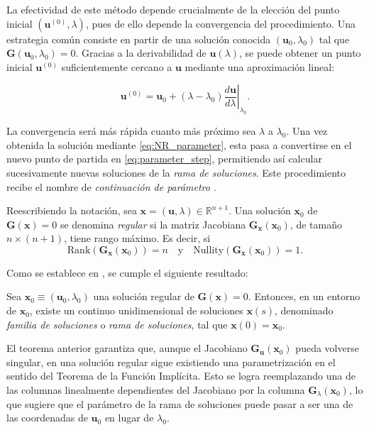 La efectividad de este método depende crucialmente de la elección del punto inicial
$ ( \mathbf{u}^{(0)}, \lambda ) $, pues de ello depende la convergencia del procedimiento.
Una estrategia común consiste en partir de una solución conocida
$ ( \mathbf{u}_0, \lambda_0 ) $ tal que $ \mathbf{G}( \mathbf{u}_0, \lambda_0 ) = 0 $.
Gracias a la derivabilidad de $ \mathbf{u}(\lambda) $, se puede obtener un punto inicial
$ \mathbf{u}^{(0)} $ suficientemente cercano a $ \mathbf{u} $ mediante una aproximación lineal:

\begin{equation}
    \mathbf{u}^{(0)} = \mathbf{u}_0 + (\lambda - \lambda_0)\left.\dfrac{d\mathbf{u}}{d\lambda}\right|_{\lambda_0}.
    \label{eq:parameter_step}
\end{equation}

La convergencia será más rápida cuanto más próximo sea $ \lambda $ a $ \lambda_0 $.
Una vez obtenida la solución mediante \eqref{eq:NR_parameter}, esta pasa a convertirse
en el nuevo punto de partida en \eqref{eq:parameter_step}, permitiendo así calcular
sucesivamente nuevas soluciones de la \emph{rama de soluciones}.
Este procedimiento recibe el nombre de \emph{continuación de parámetro} \cite{Doedel2007,Keller1977}.

Reescribiendo la notación, sea $\mathbf{x} = ( \mathbf{u}, \lambda )
    \in \mathbb{R}^{n + 1} $. Una solución $\mathbf{x}_0$ de $\mathbf{G}(\mathbf{x}) = 0$
se denomina \emph{regular} si la matriz Jacobiana $ \mathbf{G}_{\mathbf{x}}(\mathbf{x}_0) $,
de tamaño $n \times (n+1)$, tiene rango máximo. Es decir, si
\[
    \mathrm{Rank}(\mathbf{G}_{\mathbf{x}}(\mathbf{x}_0)) = n
    \quad \text{y} \quad
    \mathrm{Nullity}(\mathbf{G}_{\mathbf{x}}(\mathbf{x}_0)) = 1.
\]

Como se establece en \cite{Doedel2007}, se cumple el siguiente resultado:

\begin{theorem}
    Sea $\mathbf{x}_0 \equiv (\mathbf{u}_0, \lambda_0)$ una solución regular
    de $\mathbf{G}(\mathbf{x}) = 0$. Entonces, en un entorno de
    $\mathbf{x}_0$, existe un continuo unidimensional de soluciones
    $\mathbf{x}(s)$, denominado \emph{familia de soluciones} o \emph{rama de soluciones},
    tal que $\mathbf{x}(0) = \mathbf{x}_0$.
    \label{th:RegularSolution}
\end{theorem}

El teorema anterior garantiza que, aunque el Jacobiano
$ \mathbf{G}_{\mathbf{u}}(\mathbf{x}_0) $ pueda volverse singular,
en una solución regular sigue existiendo una parametrización en el sentido del
Teorema de la Función Implícita. Esto se logra reemplazando una de las columnas linealmente
dependientes del Jacobiano por la columna $ \mathbf{G}_{\lambda}(\mathbf{x}_0) $,
lo que sugiere que el parámetro de la rama de soluciones puede pasar a ser una de las
coordenadas de $\mathbf{u}_0$ en lugar de $ \lambda_0 $.

